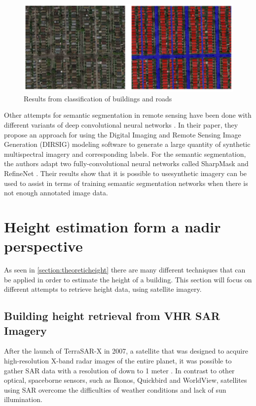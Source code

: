 \begin{figure}[!h]
	\centering
	\includegraphics[scale=0.4]{fig/aerial_segmentation.png}
	\caption{Results from classification of buildings and roads \citep{Kaiser2017}}
	\label{fig:aerialsegmentation}
\end{figure}

Other attempts for semantic segmentation in remote sensing have been done with different variants of deep convolutional neural networks \citep{Kemker2017}. In their paper, they propose an approach for using the Digital Imaging and Remote Sensing Image Generation (DIRSIG) modeling software to generate a large quantity of synthetic multispectral imagery and corresponding labels. For the semantic segmentation, the authors adapt two fully-convolutional neural networks called SharpMask \citep{Pinheiro2016} and RefineNet \citep{Lin2016}. Their results show that it is possible to usesynthetic imagery can be used to assist in terms of training semantic segmentation networks when there is not enough annotated image data.

\section{Height estimation form a nadir perspective}
As seen in \autoref{section:theoreticheight} there are many different techniques that can be applied in order to estimate the height of a building. This section will focus on different attempts to retrieve height data, using satellite imagery.

\subsection{Building height retrieval from VHR SAR Imagery}
After the launch of TerraSAR-X in 2007, a satellite that was designed to acquire high-resolution X-band radar images of the entire planet, it was possible to gather SAR data with a resolution of down to 1 meter \citep{Airbus2017}. In contrast to other optical, spaceborne sensors, such as Ikonos, Quickbird and WorldView, satellites using SAR overcome the difficulties of weather conditions and lack of sun illumination.

